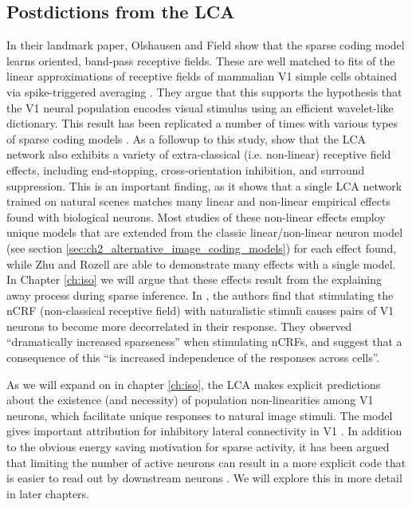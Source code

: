 \subsection{Postdictions from the LCA}
In their landmark paper, Olshausen and Field \citeyearpar{olshausen1996emergence} show that the sparse coding model learns oriented, band-pass receptive fields. These are well matched to fits of the linear approximations of receptive fields of mammalian V1 simple cells obtained via spike-triggered averaging \parencite{vanHateren1998independent}. They argue that this supports the hypothesis that the V1 neural population encodes visual stimulus using an efficient wavelet-like dictionary. This result has been replicated a number of times with various types of sparse coding models \parencite{zylberberg2011sparse, zylberberg2013sparse, rehn2007network}. As a followup to this study, \parencite{zhu2013visual} show that the LCA network also exhibits a variety of extra-classical (i.e. non-linear) receptive field effects, including end-stopping, cross-orientation inhibition, and surround suppression. This is an important finding, as it shows that a single LCA network trained on natural scenes matches many linear and non-linear empirical effects found with biological neurons. Most studies of these non-linear effects employ unique models that are extended from the classic linear/non-linear neuron model (see section \ref{sec:ch2_alternative_image_coding_models}) for each effect found, while Zhu and Rozell are able to demonstrate many effects with a single model. In Chapter \ref{ch:iso} we will argue that these effects result from the explaining away process during sparse inference. In \parencite{vinje2000sparse}, the authors find that stimulating the nCRF (non-classical receptive field) with naturalistic stimuli causes pairs of V1 neurons to become more decorrelated in their response. They observed ``dramatically increased sparseness'' when stimulating nCRFs, and suggest that a consequence of this ``is increased independence of the responses across cells''.

As we will expand on in chapter \ref{ch:iso}, the LCA makes explicit predictions about the existence (and necessity) of population non-linearities among V1 neurons, which facilitate unique responses to natural image stimuli. The model gives important attribution for inhibitory lateral connectivity in V1 \parencite{zhu2015modeling}. In addition to the obvious energy saving motivation for sparse activity, it has been argued that limiting the number of active neurons can result in a more explicit code that is easier to read out by downstream neurons \parencite{olshausen2003principles}. We will explore this in more detail in later chapters.


